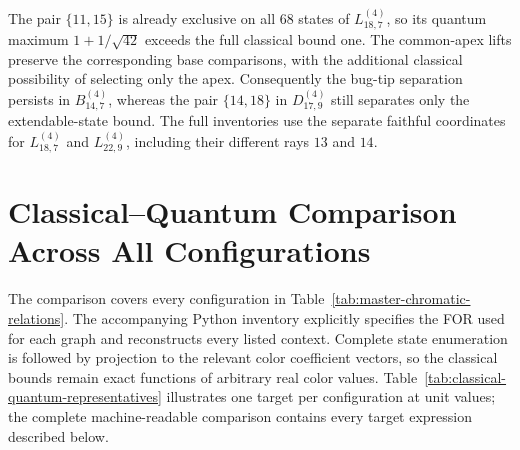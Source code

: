 \documentclass[aps,pra,reprint,superscriptaddress,longbibliography,nofootinbib,floatfix,10pt]{revtex4-2}
\theoremstyle{definition}\newtheorem{definition}[theorem]{Definition}
\theoremstyle{remark}\newtheorem{remark}[theorem]{Remark}
\begin{document}
The pair $\{11,15\}$ is already exclusive on all $68$ states of $L_{18,7}^{(4)}$, so its quantum maximum $1+1/\sqrt{42}$ exceeds the full classical bound one. The common-apex lifts preserve the corresponding base comparisons, with the additional classical possibility of selecting only the apex. Consequently the bug-tip separation persists in $B_{14,7}^{(4)}$, whereas the pair $\{14,18\}$ in $D_{17,9}^{(4)}$ still separates only the extendable-state bound. The full inventories use the separate faithful coordinates for $L_{18,7}^{(4)}$ and $L_{22,9}^{(4)}$, including their different rays $13$ and $14$.


\section{Classical--Quantum Comparison Across All Configurations}\label{sec:classical-census}

The comparison covers every configuration in Table~\ref{tab:master-chromatic-relations}. The accompanying Python inventory explicitly specifies the FOR used for each graph and reconstructs every listed context. Complete state enumeration is followed by projection to the relevant color coefficient vectors, so the classical bounds remain exact functions of arbitrary real color values. Table~\ref{tab:classical-quantum-representatives} illustrates one target per configuration at unit values; the complete machine-readable comparison contains every target expression described below.
\end{document}
